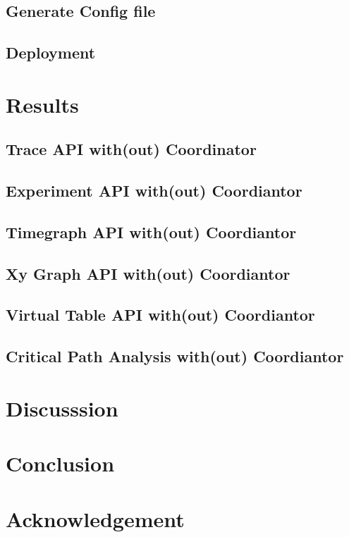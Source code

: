 \subsection{Generate Config file}

\subsection{Deployment}

\section{Results}

\subsection{Trace API with(out) Coordinator}

\subsection{Experiment API with(out) Coordiantor}

\subsection{Timegraph API with(out) Coordiantor}

\subsection{Xy Graph API with(out) Coordiantor}

\subsection{Virtual Table API with(out) Coordiantor}

\subsection{Critical Path Analysis with(out) Coordiantor}

\section{Discusssion}

\section{Conclusion}

\section{Acknowledgement}